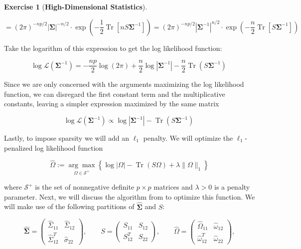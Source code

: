 \documentclass{article}
\theoremstyle{definition}
\newtheorem{exercise}{Exercise}
\theoremstyle{definition}
\theoremstyle{definition}
\theoremstyle{definition}
\theoremstyle{definition}
\DeclareMathOperator{\Tr}{Tr}
\begin{document}
\begin{exercise}[\textbf{High-Dimensional Statistics}]
\begin{enumerate}[(a)]
\[
= (2 \pi)^{-np/2} | \boldsymbol{\Sigma}|^{-n/2} \cdot \exp \left(- \frac{1}{2} \Tr \left[ nS \boldsymbol{\Sigma}^{-1}  \right]\right) = (2 \pi)^{-np/2} \left| \boldsymbol{\Sigma}^{-1} \right|^{n/2} \cdot \exp \left(- \frac{n}{2} \Tr \left[ S \boldsymbol{\Sigma}^{-1}  \right]\right)
\]

Take the logarithm of this expression to get the log likelihood function:

\[
\log \mathcal{L}(\boldsymbol{\Sigma}^{-1})  = - \frac{np}{2} \log (2 \pi) + \frac{n}{2}  \log \left| \boldsymbol{\Sigma}^{-1} \right| - \frac{n}{2} \Tr \left( S \boldsymbol{\Sigma}^{-1}  \right)\
\]

Since we are only concerned with the arguments maximizing the log likelihood function, we can disregard the first constant term and the multiplicative constants, leaving a simpler expression maximized by the same matrix

\[
\log \mathcal{L}(\boldsymbol{\Sigma}^{-1})  \propto \log \left| \boldsymbol{\Sigma}^{-1} \right| - \Tr \left( S \boldsymbol{\Sigma}^{-1}  \right)\
\]

Lastly, to impose sparsity we will add an \(\ell_1\) penalty. We will optimize the \(\ell_1\)-penalized log likelihood function

\begin{equation}\label{2018.screen.4.c.objective}
\hat{\Omega} := \underset{\Omega \in \mathcal{S}^+}{\arg \max} \left\{ \log \left| \Omega \right| - \Tr(S \Omega) + \lambda \lVert \Omega \rVert_1 \right\}
\end{equation}

where \( \mathcal{S}^+\) is the set of nonnegative definite \(p \times p\) matrices and \(\lambda > 0\) is a penalty parameter. Next, we will discuss the algorithm from \citet{Friedman2008} to optimize this function. We will make use of the following partitions of \(\boldsymbol{\hat{\Sigma}}\) and \(S\):

\begin{equation}\label{2018.screen.4.c.partitions}
\boldsymbol{\hat{\Sigma}} = \begin{pmatrix} 
\hat{\Sigma}_{11} & \hat{\Sigma}_{12} \\
\hat{\Sigma}_{12}^T & \hat{\sigma}_{22}
\end{pmatrix}, \qquad S = \begin{pmatrix} 
S_{11} & S_{12} \\
S_{12}^T & S_{22}
\end{pmatrix}, \qquad \hat{\Omega} = \begin{pmatrix} 
\hat{\Omega}_{11} & \hat{\omega}_{12} \\
\hat{\omega}_{12}^T & \hat{\omega}_{22}
\end{pmatrix},
\end{equation}


\end{enumerate}
\end{exercise}
\end{document}
